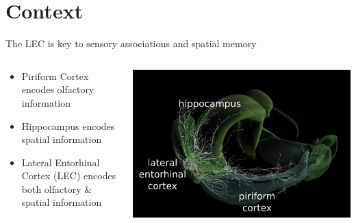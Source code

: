 \documentclass[bigger]{beamer}
\begin{document}
\section*{Context}
\label{sec:orgd34a734}
\begin{frame}[label={sec:orgb76f401}]{The LEC is key to sensory associations and spatial memory}
\begin{columns}
\begin{column}{0.45\columnwidth}
\footnotesize
\begin{itemize}
\item \alert{Piriform Cortex} encodes olfactory information
\item \alert{Hippocampus} encodes spatial information
\item \alert{Lateral Entorhinal Cortex (LEC)} encodes both olfactory \& spatial information
\end{itemize}
\end{column}
\begin{column}{0.55\columnwidth}
\begin{center}
\includegraphics[width=\textwidth]{img/brain.png}
\end{center}
\end{column}
\end{columns}
\end{frame}
\end{document}
